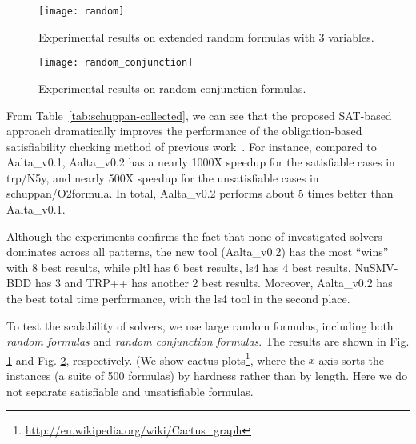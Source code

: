 \documentclass[conference]{IEEEtran}
\def\Aalta{{Aalta}}
\begin{document}
\begin{figure}
\centering
\texttt{[image: random]}
\caption{Experimental results on extended random formulas with 3 variables.}
\label{fig:random}
\end{figure}

\begin{figure}
\centering
\texttt{[image: random\_conjunction]}
\caption{Experimental results on random conjunction formulas.}
\label{fig:random_conjunction}
\end{figure}


From Table~\ref{tab:schuppan-collected}, we can see that the  proposed 
SAT-based approach dramatically improves the performance of the 
obligation-based satisfiability checking method of previous 
work~\cite{LZPVH13}. For instance, compared to \Aalta\_v0.1, \Aalta\_v0.2 
has a nearly 1000X speedup for the satisfiable cases in 
\textsf{trp/N5y}, and nearly 500X speedup for the unsatisfiable cases in
\textsf{schuppan/O2formula}. In total, \Aalta\_v0.2 performs about 5 times 
better than \Aalta\_v0.1.



Although the experiments confirms the fact that none of investigated solvers
dominates across all patterns, the new tool (\Aalta\_v0.2) has the most 
``wins'' with 8 best results, while pltl has 6 best results, ls4 has 4 best
results, NuSMV-BDD has 3 and TRP++ has another 2 best results. 
Moreover, \Aalta\_v0.2 has the best total time performance,
with the ls4 tool in the second place.


 

\iffalse
\begin{figure}[t]
\begin{minipage}[b]{0.45\linewidth}
\centering
\texttt{[image: polsat\_sat]}
\caption{Polsat improvement on extended satisfiable random formulas with 3 variables.}
\label{fig:polsat_sat}
\end{minipage}
\hspace{0.6cm}
\begin{minipage}[b]{0.45\linewidth}
\centering
\texttt{[image: polsat\_unsat]}
\caption{Polsat improvement on extended unsatisfiable random formulas with 3 variables.}
\label{fig:polsat_unsat}
\end{minipage}
\end{figure}
\fi

To test the scalability of solvers, we use large random formulas, 
including both \textit{random formulas} and 
\textit{random conjunction formulas}.
The results are shown in Fig. \ref{fig:random} and
Fig. \ref{fig:random_conjunction}, respectively. (We show cactus plots\footnote{\url{http://en.wikipedia.org/wiki/Cactus_graph}}, 
where the $x$-axis sorts the instances (a suite of 500 formulas) by 
hardness rather than by length.
Here we do not separate satisfiable and unsatisfiable formulas.
\end{document}
